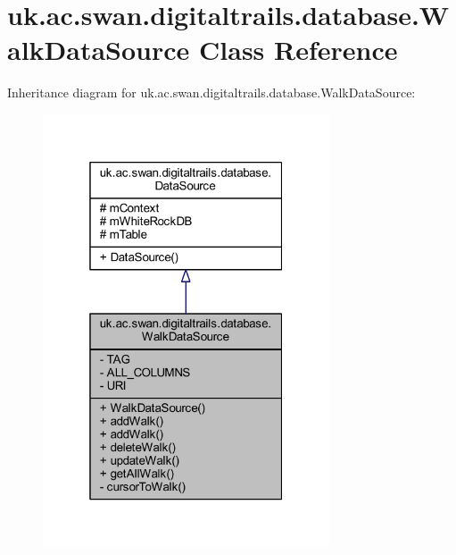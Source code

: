 \hypertarget{classuk_1_1ac_1_1swan_1_1digitaltrails_1_1database_1_1_walk_data_source}{\section{uk.\+ac.\+swan.\+digitaltrails.\+database.\+Walk\+Data\+Source Class Reference}
\label{classuk_1_1ac_1_1swan_1_1digitaltrails_1_1database_1_1_walk_data_source}
}


Inheritance diagram for uk.\+ac.\+swan.\+digitaltrails.\+database.\+Walk\+Data\+Source\+:
\nopagebreak
\begin{figure}[H]
\begin{center}
\leavevmode
\includegraphics[width=241pt]{classuk_1_1ac_1_1swan_1_1digitaltrails_1_1database_1_1_walk_data_source__inherit__graph}
\end{center}
\end{figure}


